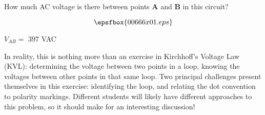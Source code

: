

How much AC voltage is there between points {\bf A} and {\bf B} in this circuit?

$$\epsfbox{00666x01.eps}$$







$V_{AB} =$ 397 VAC







In reality, this is nothing more than an exercise in Kirchhoff's Voltage Law (KVL): determining the voltage between two points in a loop, knowing the voltages between other points in that same loop.  Two principal challenges present themselves in this exercise: identifying the loop, and relating the dot convention to polarity markings.  Different students will likely have different approaches to this problem, so it should make for an interesting discussion!




